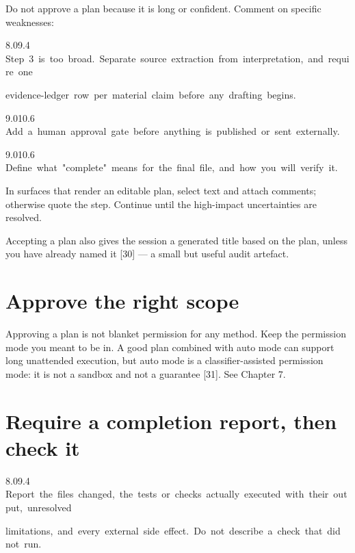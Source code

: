 \documentclass[11pt,a4paper,twoside,openany]{book}
\newcommand{\cl}[1]{\noindent\mbox{#1}\par}
\begin{document}
Do not approve a plan because it is long or confident. Comment on specific weaknesses:


\begin{codeblock}{8.0}{9.4}
\cl{Step~3~is~too~broad.~Separate~source~extraction~from~interpretation,~and~require~one}
\cl{evidence-ledger~row~per~material~claim~before~any~drafting~begins.}
\end{codeblock}

\begin{codeblock}{9.0}{10.6}
\cl{Add~a~human~approval~gate~before~anything~is~published~or~sent~externally.}
\end{codeblock}

\begin{codeblock}{9.0}{10.6}
\cl{Define~what~"complete"~means~for~the~final~file,~and~how~you~will~verify~it.}
\end{codeblock}

In surfaces that render an editable plan, select text and attach comments; otherwise quote the step. Continue until the high-impact uncertainties are resolved.


Accepting a plan also gives the session a generated title based on the plan, unless you have already named it [30] — a small but useful audit artefact.


\FloatBarrier
\setcounter{section}{3}
\section{Approve the right scope}

Approving a plan is not blanket permission for any method. Keep the permission mode you meant to be in. A good plan combined with auto mode can support long unattended execution, but auto mode is a classifier-assisted permission mode: it is not a sandbox and not a guarantee [31]. See Chapter 7.


\FloatBarrier
\setcounter{section}{4}
\section{Require a completion report, then check it}

\begin{codeblock}{8.0}{9.4}
\cl{Report~the~files~changed,~the~tests~or~checks~actually~executed~with~their~output,~unresolved}
\cl{limitations,~and~every~external~side~effect.~Do~not~describe~a~check~that~did~not~run.}
\end{codeblock}
\end{document}
